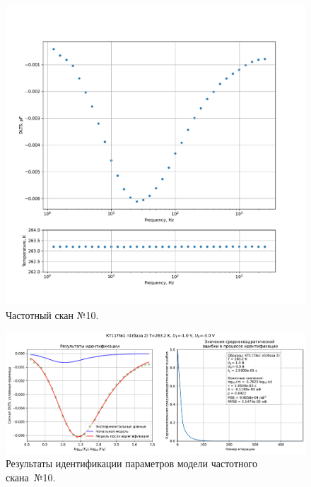 \begin{figure}[!ht]
    \centering
    \includegraphics[width=1\textwidth]{../plots/КТ117№1_п1(база 2)_2500Гц-1Гц_1пФ_-10С_-1В-3В_100мВ_20мкс_шаг_0,1.pdf}
    \caption{Частотный скан №10.}
    \label{pic:frequency_scan_10}
\end{figure}

\begin{figure}[!ht]
    \centering
    \includegraphics[width=1\textwidth]{../plots/КТ117№1_п1(база 2)_2500Гц-1Гц_1пФ_-10С_-1В-3В_100мВ_20мкс_шаг_0,1_model.pdf}
    \caption{Результаты идентификации параметров модели частотного скана~№10.}
    \label{pic:frequency_scan_model10}
\end{figure}

\pagebreak


